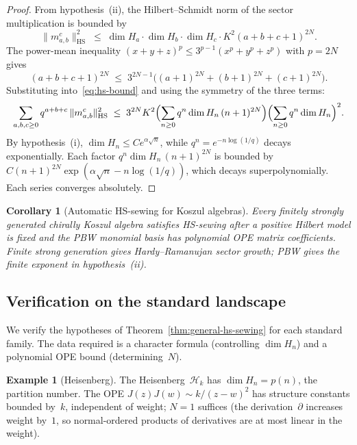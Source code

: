 \documentclass[11pt,reqno]{amsart}
\newtheorem{corollary}[theorem]{Corollary}
\theoremstyle{definition}
\newtheorem{example}[theorem]{Example}
\theoremstyle{remark}
\newcommand{\cH}{\mathcal{H}}
\newcommand{\HS}{\mathrm{HS}}
\numberwithin{equation}{section}
\begin{document}
\begin{proof}
From hypothesis~(ii), the Hilbert--Schmidt norm of the sector
multiplication is bounded by
\begin{equation}\label{eq:hs-bound}
\|m_{a,b}^c\|_{\HS}^2
\;\leq\;
\dim H_a \cdot \dim H_b \cdot \dim H_c \cdot
K^2(a+b+c+1)^{2N}.
\end{equation}
The power-mean inequality
$(x+y+z)^p \leq 3^{p-1}(x^p + y^p + z^p)$ with $p = 2N$ gives
\[
(a+b+c+1)^{2N}
\;\leq\;
3^{2N-1}\bigl((a+1)^{2N} + (b+1)^{2N} + (c+1)^{2N}\bigr).
\]
Substituting into~\eqref{eq:hs-bound} and using the symmetry
of the three terms:
\[
\sum_{a,b,c \geq 0}
q^{a+b+c}\,\|m_{a,b}^c\|_{\HS}^2
\;\leq\;
3^{2N}K^2
\Bigl(\sum_{n \geq 0} q^n\dim H_n\,(n+1)^{2N}\Bigr)
\Bigl(\sum_{n \geq 0} q^n\dim H_n\Bigr)^2.
\]
By hypothesis~(i), $\dim H_n \leq Ce^{\alpha\sqrt{n}}$,
while $q^n = e^{-n\log(1/q)}$ decays exponentially.  Each
factor $q^n\dim H_n\,(n+1)^{2N}$ is bounded by
$C(n+1)^{2N}\exp(\alpha\sqrt{n} - n\log(1/q))$,
which decays superpolynomially.  Each series converges
absolutely.
\end{proof}

\begin{corollary}[Automatic HS-sewing for Koszul
 algebras]\label{cor:koszul-automatic}
Every finitely strongly generated chirally Koszul algebra
satisfies HS-sewing after a positive Hilbert model is fixed and the
PBW monomial basis has polynomial OPE matrix coefficients.  Finite
strong generation gives Hardy--Ramanujan sector growth; PBW gives
the finite exponent in hypothesis~(ii).
\end{corollary}

\subsection{Verification on the standard
 landscape}\label{subsec:verification}

We verify the hypotheses of
Theorem~\ref{thm:general-hs-sewing} for each standard family.
The data required is a character formula (controlling
$\dim H_n$) and a polynomial OPE bound (determining~$N$).

\begin{example}[Heisenberg]\label{ex:heisenberg}
The Heisenberg~$\cH_k$ has $\dim H_n = p(n)$, the partition
number.  The OPE
$J(z)J(w) \sim k/(z-w)^2$ has structure constants bounded
by~$k$, independent of weight; $N = 1$ suffices (the
derivation~$\partial$ increases weight by~$1$, so normal-ordered
products of derivatives are at most linear in the weight).
\end{example}
\end{document}
